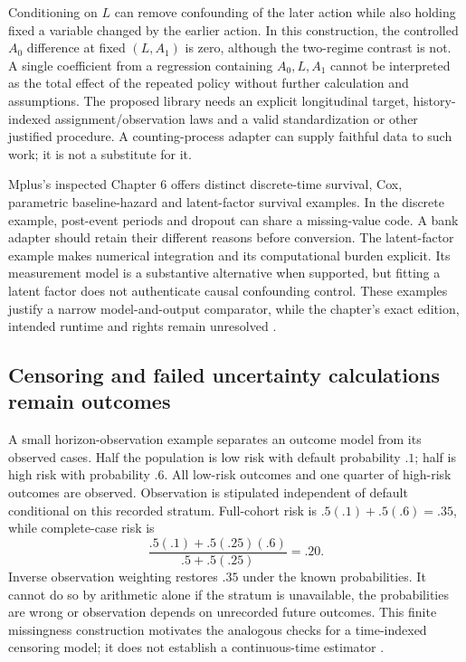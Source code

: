 Conditioning on $L$ can remove confounding of the later action while also
holding fixed a variable changed by the earlier action. In this construction,
the controlled $A_0$ difference at fixed $(L,A_1)$ is zero, although the
two-regime contrast is not. A single coefficient from a regression containing
$A_0,L,A_1$ cannot be interpreted as the total effect of the repeated policy
without further calculation and assumptions. The proposed library needs an
explicit longitudinal target, history-indexed assignment/observation laws
and a valid standardization or other justified procedure. A counting-process
adapter can supply faithful data to such work; it is not a substitute for it.

Mplus's inspected Chapter 6 offers distinct discrete-time survival, Cox,
parametric baseline-hazard and latent-factor survival examples. In the
discrete example, post-event periods and dropout can share a missing-value
code. A bank adapter should retain their different reasons before conversion.
The latent-factor example makes numerical integration and its computational
burden explicit. Its measurement model is a substantive alternative when
supported, but fitting a latent factor does not authenticate causal confounding
control. These examples justify a narrow model-and-output comparator, while
the chapter's exact edition, intended runtime and rights remain unresolved
\citep{exec14_survival_mplus}.

\subsection{Censoring and failed uncertainty calculations remain outcomes}

A small horizon-observation example separates an outcome model from its
observed cases. Half the population is low risk with default probability $.1$;
half is high risk with probability $.6$. All low-risk outcomes and one quarter
of high-risk outcomes are observed. Observation is stipulated independent
of default conditional on this recorded stratum. Full-cohort risk is
$.5(.1)+.5(.6)=.35$, while complete-case risk is
\[
 \frac{.5(.1)+.5(.25)(.6)}{.5+.5(.25)}=.20.
\]
Inverse observation weighting restores $.35$ under the known probabilities.
It cannot do so by arithmetic alone if the stratum is unavailable, the
probabilities are wrong or observation depends on unrecorded future outcomes.
This finite missingness construction motivates the analogous checks for a
time-indexed censoring model; it does not establish a continuous-time estimator
\citep{exec14_survival_exact}.

